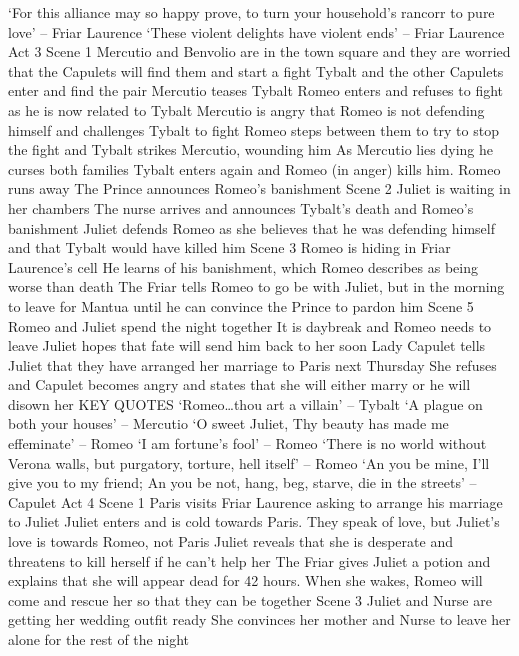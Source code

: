 \documentclass{article}
\begin{document}
\begin{outline}
\3 `For this alliance may so happy prove, to turn your household's rancorr to pure love' -- Friar Laurence
\3 `These violent delights have violent ends' -- Friar Laurence
\1 Act 3
\2 Scene 1
\3 Mercutio and Benvolio are in the town square and they are worried that the Capulets will find them and start a fight
\3 Tybalt and the other Capulets enter and find the pair
\3 Mercutio teases Tybalt
\3 Romeo enters and refuses to fight as he is now related to Tybalt
\3 Mercutio is angry that Romeo is not defending himself and challenges Tybalt to fight
\3 Romeo steps between them to try to stop the fight and Tybalt strikes Mercutio, wounding him
\3 As Mercutio lies dying he curses both families
\3 Tybalt enters again and Romeo (in anger) kills him. Romeo runs away
\3 The Prince announces Romeo's banishment
\2 Scene 2
\3 Juliet is waiting in her chambers
\3 The nurse arrives and announces Tybalt's death and Romeo's banishment
\3 Juliet defends Romeo as she believes that he was defending himself and that Tybalt would have killed him
\2 Scene 3
\3 Romeo is hiding in Friar Laurence's cell
\3 He learns of his banishment, which Romeo describes as being worse than death
\3 The Friar tells Romeo to go be with Juliet, but in the morning to leave for Mantua until he can convince the Prince to pardon him
\2 Scene 5
\3 Romeo and Juliet spend the night together
\3 It is daybreak and Romeo needs to leave
\3 Juliet hopes that fate will send him back to her soon
\3 Lady Capulet tells Juliet that they have arranged her marriage to Paris next Thursday
\3 She refuses and Capulet becomes angry and states that she will either marry or he will disown her
\2 KEY QUOTES
\3 `Romeo\dots thou art a villain' -- Tybalt
\3 `A plague on both your houses' -- Mercutio
\3 `O sweet Juliet, Thy beauty has made me effeminate' -- Romeo
\3 `I am fortune's fool' -- Romeo
\3 `There is no world without Verona walls, but purgatory, torture, hell itself' -- Romeo
\3 `An you be mine, I'll give you to my friend; An you be not, hang, beg, starve, die in the streets' -- Capulet
\1 Act 4
\2 Scene 1
\3 Paris visits Friar Laurence asking to arrange his marriage to Juliet
\3 Juliet enters and is cold towards Paris. They speak of love, but Juliet's love is towards Romeo, not Paris
\3 Juliet reveals that she is desperate and threatens to kill herself if he can't help her
\3 The Friar gives Juliet a potion and explains that she will appear dead for 42 hours. When she wakes, Romeo will come and rescue her so that they can be together
\2 Scene 3
\3 Juliet and Nurse are getting her wedding outfit ready
\3 She convinces her mother and Nurse to leave her alone for the rest of the night

\end{outline}
\end{document}

